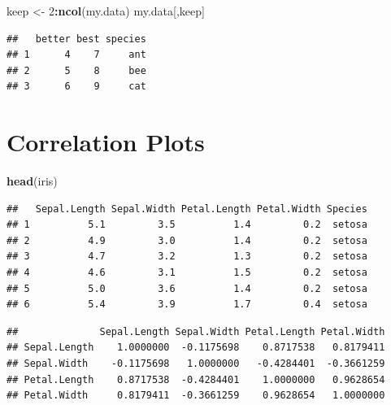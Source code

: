 \documentclass[]{book}
\newenvironment{Shaded}{\begin{snugshade}}{\end{snugshade}}
\newcommand{\DecValTok}[1]{\textcolor[rgb]{0.00,0.00,0.81}{#1}}
\newcommand{\KeywordTok}[1]{\textcolor[rgb]{0.13,0.29,0.53}{\textbf{#1}}}
\newcommand{\NormalTok}[1]{#1}
\newcommand{\OperatorTok}[1]{\textcolor[rgb]{0.81,0.36,0.00}{\textbf{#1}}}
\newcommand{\StringTok}[1]{\textcolor[rgb]{0.31,0.60,0.02}{#1}}
\begin{document}
\begin{Shaded}
\begin{Highlighting}[]
\NormalTok{keep <-}\StringTok{ }\DecValTok{2}\OperatorTok{:}\KeywordTok{ncol}\NormalTok{(my.data)}
\NormalTok{my.data[,keep]}
\end{Highlighting}
\end{Shaded}

\begin{verbatim}
##   better best species
## 1      4    7     ant
## 2      5    8     bee
## 3      6    9     cat
\end{verbatim}

\hypertarget{correlation}{%
\chapter{Correlation Plots}\label{correlation}}

\begin{Shaded}
\begin{Highlighting}[]
\KeywordTok{head}\NormalTok{(iris)}
\end{Highlighting}
\end{Shaded}

\begin{verbatim}
##   Sepal.Length Sepal.Width Petal.Length Petal.Width Species
## 1          5.1         3.5          1.4         0.2  setosa
## 2          4.9         3.0          1.4         0.2  setosa
## 3          4.7         3.2          1.3         0.2  setosa
## 4          4.6         3.1          1.5         0.2  setosa
## 5          5.0         3.6          1.4         0.2  setosa
## 6          5.4         3.9          1.7         0.4  setosa
\end{verbatim}

\begin{Shaded}
\end{Shaded}

\begin{verbatim}
##              Sepal.Length Sepal.Width Petal.Length Petal.Width
## Sepal.Length    1.0000000  -0.1175698    0.8717538   0.8179411
## Sepal.Width    -0.1175698   1.0000000   -0.4284401  -0.3661259
## Petal.Length    0.8717538  -0.4284401    1.0000000   0.9628654
## Petal.Width     0.8179411  -0.3661259    0.9628654   1.0000000
\end{verbatim}
\end{document}
